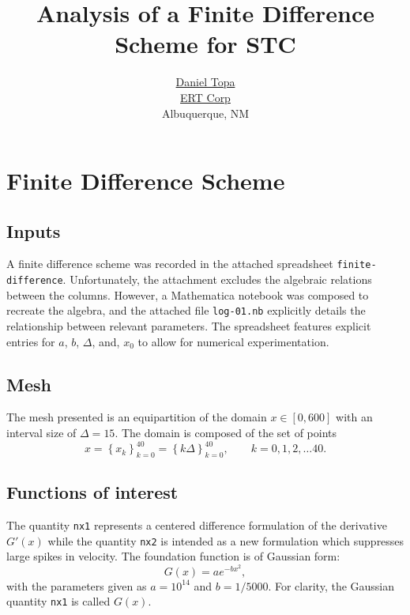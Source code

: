 \documentclass[10pt, oneside]{article}
\title{Analysis of a Finite Difference Scheme for STC}
\author{\href{mailto:daniel.topa@ertcorp.com}{Daniel Topa}\\\href{https://www.ertcorp.com/}{ERT Corp}\\Albuquerque, NM}
\newcommand{\brac}[1]			{ \left[  #1 \right] }
\begin{document}
\maketitle
{}

\section{Finite Difference Scheme} %

\subsection{Inputs} %
A finite difference scheme was recorded in the attached spreadsheet \texttt{finite-difference}. Unfortunately, the attachment excludes the algebraic relations between the columns. However, a Mathematica notebook was composed to recreate the algebra, and the attached file \texttt{log-01.nb} explicitly details the relationship between relevant parameters. The spreadsheet features explicit entries for $a$, $b$, $\Delta$, and, $x_{0}$ to allow for numerical experimentation.

\subsection{Mesh} %
The mesh presented is an equipartition of the domain $x\in\brac{0,600}$ with an interval size of $\Delta = 15$. The domain is composed of the set of points
\begin{equation}
	x = \left\{x_{k}\right\} _{k=0}^{40 }= \left\{k \Delta \right\} _{k=0}^{40 }, \qquad k=0,1,2,\dots 40.
\end{equation}

\subsection{Functions of interest} %
The quantity \texttt{nx1} represents a centered difference formulation of the derivative $G'(x)$ while the quantity \texttt{nx2} is intended as a new formulation which suppresses large spikes in velocity. The foundation function is of Gaussian form:
\begin{equation}
	G(x) = a e^{-bx^{2}},
\end{equation}
with the parameters given as $a=10^{14}$ and $b=1/5000$. For clarity, the Gaussian quantity \texttt{nx1} is called $G(x)$.
\end{document}
